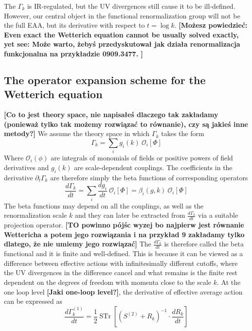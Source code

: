 \documentclass[11pt, a4paper]{article}
\newcommand{\jhkbf}[1]{\textbf{\color{red} [#1]}}
\begin{document}
The $\Gamma_k$ is IR-regulated, but the UV divergences still cause it to be ill-defined. 
However, our central object in the functional renormalization group will not be the full EAA, 
but its derivative with respect to $t = \log{k}$. 
\jhkbf{Możesz powiedzieć: Even exact the Wetterich equation cannot be usually solved exactly, yet see:
Może warto, żebyś przedyskutował jak działa renormalizacja funkcjonalna na przykładzie 0909.3477.
}
\subsection{The operator expansion scheme for the Wetterich equation}
\jhkbf{Co to jest theory space, nie napisałeś dlaczego tak zakładamy (ponieważ tylko tak możemy rozwiązać to równanie), czy są jakieś inne metody?}
We assume the theory space in which $\Gamma_k$ takes the form
\begin{equation}
    \Gamma_k = \sum_i g_i(k) \ \mathcal{O}_i [\Phi]
    \label{gamma_decomp}
\end{equation}
Where $\mathcal{O}_i (\phi)$ are integrals of monomials of fields or positive powers of field derivatives 
and $g_i(k)$ are scale-dependent couplings.
The coefficients in the derivative $\partial_t \Gamma_k$ are therefore simply the beta functions of corresponding operators
\begin{equation}
    \frac{d \Gamma_k}{dt} = \sum_i \frac{d g_i}{dt} \ \mathcal{O}_i [\Phi] = \beta_i(g,k) \ \mathcal{O}_i [\Phi]
\end{equation}
The beta functions may depend on all the couplings, as well as the renormalization scale $k$ and
they can later be extracted from $\frac{d \Gamma_k}{dt}$ via a suitable projection operator. 
\jhkbf{TO powinno pójśc wyzej bo najpierw jest równanie Wettericha a potem jego rozwiązania i na przykład 9 zakładamy tylko dlatego, że nie umiemy jego rozwiązać}
The $\frac{d \Gamma_k}{dt}$ is therefore called the beta functional and it is finite and well-defined.
This is because it can be viewed as a difference between effective actions with infinitesimally
different cutoffs, where the UV divergences in the difference cancel and what remains is the finite rest
dependent on the degrees of freedom with momenta close to the scale $k$.
At the one loop level \jhkbf{Jaki one-loop level?}, the derivative of effective average action can be expressed as
\begin{equation}
    \frac{d \Gamma_k^{(1)}}{dt} = \frac{1}{2} \operatorname{STr} \left[ \left(S^{(2)} + R_k\right)^{-1} \cdot \frac{d R_k}{dt} \right]
    \label{1LEAA}
\end{equation}
\end{document}
